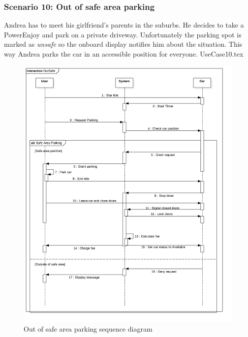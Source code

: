 \documentclass[12pt]{article}
\begin{document}
		\subsubsection{Scenario 10: Out of safe area parking}
		Andrea has to meet his girlfriend's parents in the suburbs. He decides to take a PowerEnjoy
		and park on a private driveway. Unfortunately the parking spot is marked as \emph{unsafe} so 	
		the onboard  display notifies him about the situation. This way Andrea parks the car in an
		accessible position for everyone.
		\FloatBarrier
		{UseCase10.tex}
		\newpage
		\begin{figure}[htbp]
		\caption{Out of safe area parking sequence diagram}
		\includegraphics[scale=0.49]{Images/SequenceDiagram/OutSafe.png}
 	 	\end{figure}
 	 	\clearpage
		
\end{document}
